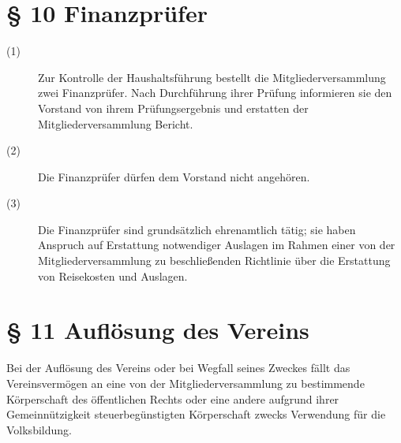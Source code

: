 \documentclass[12pt,paper=a4,ngerman]{scrreprt}
\begin{document}
\section{\S{} 10 Finanzprüfer}
\begin{description}
\item[(1)]
Zur Kontrolle der Haushaltsführung bestellt die Mitgliederversammlung
zwei Finanzprüfer. Nach Durchführung ihrer Prüfung informieren sie den
Vorstand von ihrem Prüfungsergebnis und erstatten der
Mitgliederversammlung Bericht.
\item[(2)]
Die Finanzprüfer dürfen dem Vorstand nicht angehören.
\item[(3)]
Die Finanzprüfer sind grundsätzlich ehrenamtlich tätig; sie haben
Anspruch auf Erstattung notwendiger Auslagen im Rahmen einer von der
Mitgliederversammlung zu beschließenden Richtlinie über die Erstattung
von Reisekosten und Auslagen.
\end{description}

\section{\S{} 11 Auflösung des Vereins}
Bei der Auflösung des Vereins oder bei Wegfall seines Zweckes fällt
das Vereinsvermögen an eine von der Mitgliederversammlung zu
bestimmende Körperschaft des öffentlichen Rechts oder eine andere
aufgrund ihrer Gemeinnützigkeit steuerbegünstigten Körperschaft zwecks
Verwendung für die Volksbildung.
\end{document}
